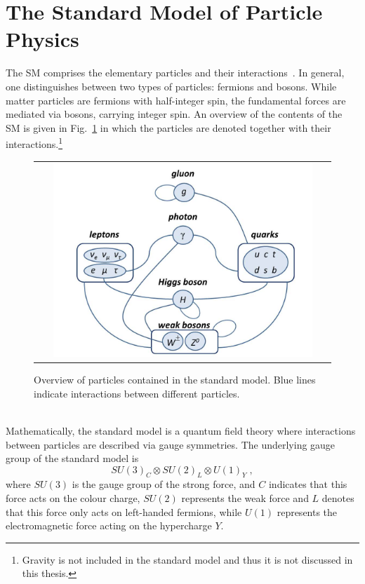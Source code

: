 \section{The Standard Model of Particle Physics}
\label{sec:sm}
The SM comprises the elementary particles and their interactions~\cite{Agashe:2014kda}. In general, one distinguishes between two types of particles: fermions and bosons. While matter particles are fermions with half-integer spin, the fundamental forces are mediated via bosons, carrying integer spin. An overview of the contents of the SM is given in Fig.~\ref{fig:SM} in which the particles are denoted together with their interactions.\footnote{Gravity is not included in the standard model and thus it is not discussed in this thesis.} 
\begin{figure}[!tp]
  \centering 
  \begin{tabular}{c}
    \includegraphics[width=0.9\textwidth]{figures/SM.jpg}
  \end{tabular}
  \caption{Overview of particles contained in the standard model. Blue lines indicate interactions between different particles.}
  \label{fig:SM}
\end{figure}
\\
Mathematically, the standard model is a quantum field theory where interactions between particles are described via gauge symmetries. The underlying gauge group of the standard model is 
\begin{equation*}
SU(3)_{C} \otimes SU(2)_{L} \otimes U(1)_{Y} \; ,
\end{equation*}
where $SU(3)$ is the gauge group of the strong force, and $C$ indicates that this force acts on the colour charge, $SU(2)$ represents the weak force and $L$ denotes that this force only acts on left-handed fermions, while $U(1)$ represents the electromagnetic force acting on the hypercharge $Y$.\\
